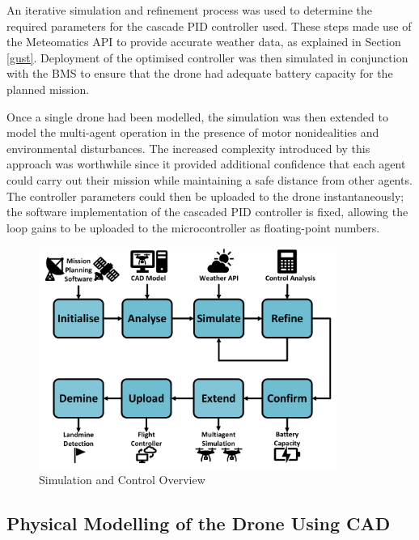 An iterative simulation and refinement process was used to determine the required parameters for the cascade \gls{PID} controller used. These steps made use of the Meteomatics API to provide accurate weather data, as explained in Section \ref{gust}. Deployment of the optimised controller was then simulated in conjunction with the \gls{BMS} to ensure that the drone had adequate battery capacity for the planned mission. 

Once a single drone had been modelled, the simulation was then extended to model the multi-agent operation in the presence of motor nonidealities and environmental disturbances. The increased complexity introduced by this approach was worthwhile since it provided additional confidence that each agent could carry out their mission while maintaining a safe distance from other agents. The controller parameters could then be uploaded to the drone instantaneously; the software implementation of the cascaded \acrshort{PID} controller is fixed, allowing the loop gains to be uploaded to the microcontroller as floating-point numbers.



\begin{figure}[H]
\centering
\includegraphics[width=0.87\textwidth]{figs/Samuel/Figures/Sim and Control Overview BASIC1 (1) (1).pdf}
\caption{Simulation and Control Overview}
\label{fig:simctrloverview}
\end{figure}





\subsection{Physical Modelling of the Drone Using CAD}
\label{CAD}


